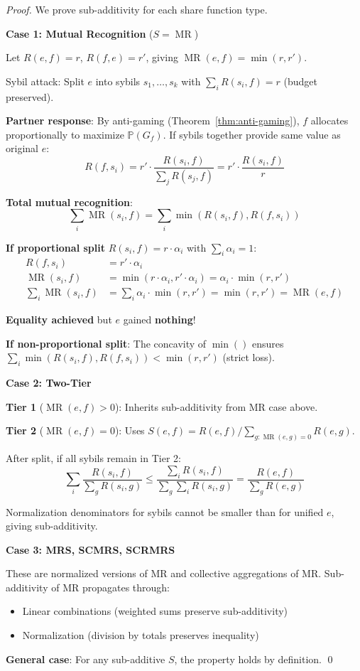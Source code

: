 \documentclass[11pt,a4paper]{article}
\theoremstyle{definition}
\theoremstyle{remark}
\DeclareMathOperator{\MR}{MR}
\begin{document}
\begin{proof}
We prove sub-additivity for each share function type.

\textbf{Case 1: Mutual Recognition} ($S = \MR$)

Let $R(e,f) = r$, $R(f,e) = r'$, giving $\MR(e,f) = \min(r, r')$.

Sybil attack: Split $e$ into sybils $s_1, \ldots, s_k$ with $\sum_i R(s_i, f) = r$ (budget preserved).

\textbf{Partner response}: By anti-gaming (Theorem~\ref{thm:anti-gaming}), $f$ allocates proportionally to maximize $\mathbb{P}(G_f)$. If sybils together provide same value as original $e$:
\[ R(f, s_i) = r' \cdot \frac{R(s_i, f)}{\sum_j R(s_j, f)} = r' \cdot \frac{R(s_i, f)}{r} \]

\textbf{Total mutual recognition}:
\[ \sum_i \MR(s_i, f) = \sum_i \min(R(s_i, f), R(f, s_i)) \]

\textbf{If proportional split} $R(s_i, f) = r \cdot \alpha_i$ with $\sum_i \alpha_i = 1$:
\begin{align*}
R(f, s_i) &= r' \cdot \alpha_i \\
\MR(s_i, f) &= \min(r \cdot \alpha_i, r' \cdot \alpha_i) = \alpha_i \cdot \min(r, r') \\
\sum_i \MR(s_i, f) &= \sum_i \alpha_i \cdot \min(r, r') = \min(r, r') = \MR(e,f)
\end{align*}

\textbf{Equality achieved} but $e$ gained \textbf{nothing}!

\textbf{If non-proportional split}: The concavity of $\min()$ ensures $\sum_i \min(R(s_i, f), R(f, s_i)) < \min(r, r')$ (strict loss).

\medskip

\textbf{Case 2: Two-Tier}

\textbf{Tier 1} ($\MR(e,f) > 0$): Inherits sub-additivity from MR case above.

\textbf{Tier 2} ($\MR(e,f) = 0$): Uses $S(e,f) = R(e,f) / \sum_{g:\MR(e,g)=0} R(e,g)$.

After split, if all sybils remain in Tier 2:
\[ \sum_i \frac{R(s_i,f)}{\sum_g R(s_i,g)} \le \frac{\sum_i R(s_i,f)}{\sum_g \sum_i R(s_i,g)} = \frac{R(e,f)}{\sum_g R(e,g)} \]

Normalization denominators for sybils cannot be smaller than for unified $e$, giving sub-additivity.

\medskip

\textbf{Case 3: MRS, SCMRS, SCRMRS}

These are normalized versions of MR and collective aggregations of MR. Sub-additivity of MR propagates through:
\begin{itemize}
\item Linear combinations (weighted sums preserve sub-additivity)
\item Normalization (division by totals preserves inequality)
\end{itemize}

\medskip

\textbf{General case}: For any sub-additive $S$, the property holds by definition. \qed
\end{proof}
\end{document}
